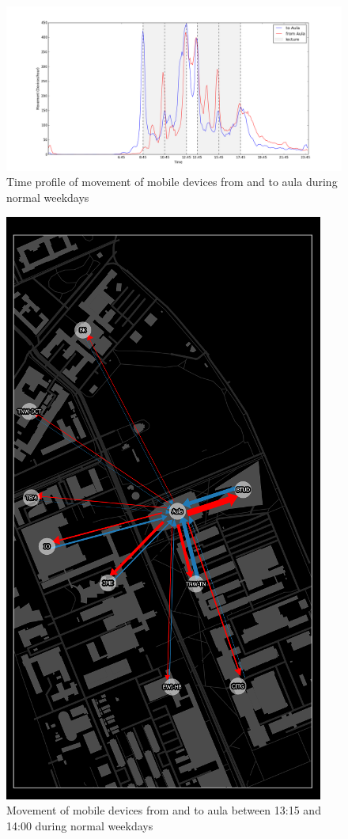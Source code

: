 \begin{figure}[H]
\centering
\includegraphics[scale=0.2]{building_fromTo_aulaGraph.png}
\captionsetup{justification=centering}
\caption{Time profile of movement of mobile devices from and to aula during normal weekdays}
\label{figure:ES-buildingFromToAulaGraph}
\end{figure}

\begin{figure}[H]
\centering
\includegraphics[scale=0.1]{ES-map_1315to1400.png}
\captionsetup{justification=centering}
\caption{Movement of mobile devices from and to aula between 13:15 and 14:00 during normal weekdays}
\label{figure:ES-1315to1400}
\end{figure}


